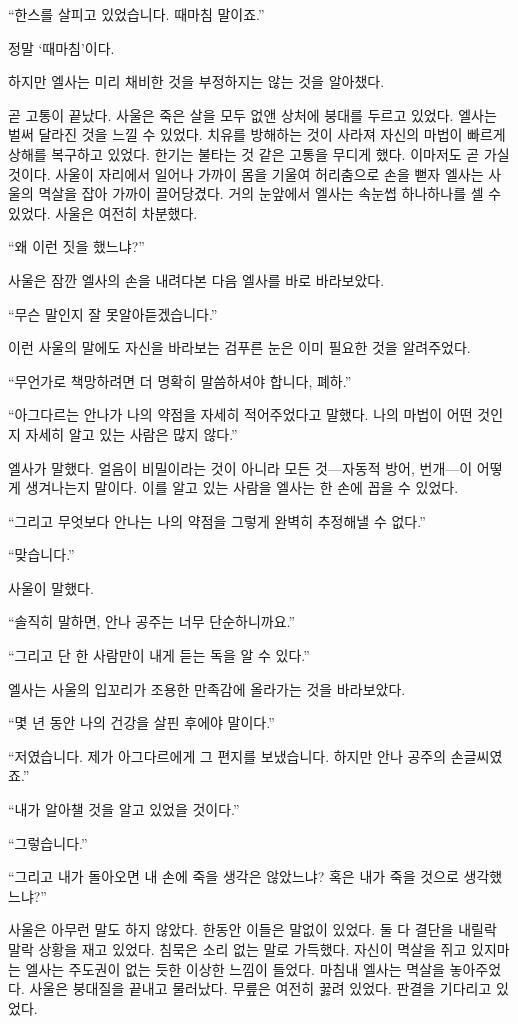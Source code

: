 ``한스를 살피고 있었습니다. 때마침 말이죠.''

정말 `때마침'이다.

하지만 엘사는 미리 채비한 것을 부정하지는 않는 것을 알아챘다.

곧 고통이 끝났다. 사울은 죽은 살을 모두 없앤 상처에 붕대를 두르고 있었다. 엘사는 벌써 달라진 것을 느낄 수 있었다. 치유를 방해하는 것이 사라져 자신의 마법이 빠르게 상해를 복구하고 있었다. 한기는 불타는 것 같은 고통을 무디게 했다. 이마저도 곧 가실 것이다. 사울이 자리에서 일어나 가까이 몸을 기울여 허리춤으로 손을 뻗자 엘사는 사울의 멱살을 잡아 가까이 끌어당겼다. 거의 눈앞에서 엘사는 속눈썹 하나하나를 셀 수 있었다. 사울은 여전히 차분했다.

``왜 이런 짓을 했느냐?''

사울은 잠깐 엘사의 손을 내려다본 다음 엘사를 바로 바라보았다.

``무슨 말인지 잘 못알아듣겠습니다.''

이런 사울의 말에도 자신을 바라보는 검푸른 눈은 이미 필요한 것을 알려주었다.

``무언가로 책망하려면 더 명확히 말씀하셔야 합니다, 폐하.''

``아그다르는 안나가 나의 약점을 자세히 적어주었다고 말했다. 나의 마법이 어떤 것인지 자세히 알고 있는 사람은 많지 않다.''

엘사가 말했다. 얼음이 비밀이라는 것이 아니라 모든 것—자동적 방어, 번개—이 어떻게 생겨나는지 말이다. 이를 알고 있는 사람을 엘사는 한 손에 꼽을 수 있었다.

``그리고 무엇보다 안나는 나의 약점을 그렇게 완벽히 추정해낼 수 없다.''

``맞습니다.''

사울이 말했다.

``솔직히 말하면, 안나 공주는 너무 단순하니까요.''

``그리고 단 한 사람만이 내게 듣는 독을 알 수 있다.''

엘사는 사울의 입꼬리가 조용한 만족감에 올라가는 것을 바라보았다.

``몇 년 동안 나의 건강을 살핀 후에야 말이다.''

``저였습니다. 제가 아그다르에게 그 편지를 보냈습니다. 하지만 안나 공주의 손글씨였죠.''

``내가 알아챌 것을 알고 있었을 것이다.''

``그렇습니다.''

``그리고 내가 돌아오면 내 손에 죽을 생각은 않았느냐? 혹은 내가 죽을 것으로 생각했느냐?''

사울은 아무런 말도 하지 않았다. 한동안 이들은 말없이 있었다. 둘 다 결단을 내릴락 말락 상황을 재고 있었다. 침묵은 소리 없는 말로 가득했다. 자신이 멱살을 쥐고 있지마는 엘사는 주도권이 없는 듯한 이상한 느낌이 들었다. 마침내 엘사는 멱살을 놓아주었다. 사울은 붕대질을 끝내고 물러났다. 무릎은 여전히 꿇려 있었다. 판결을 기다리고 있었다.

